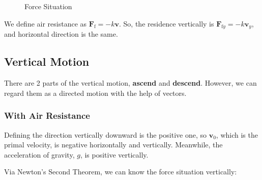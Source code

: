 \documentclass{article}
\begin{document}
\begin{figure}[H]
    \centering
    \caption{Force Situation}
    \label{fig:force-situation}
\end{figure}

We define air resistance as $\boldsymbol{F}_\mathrm{f}=-k\boldsymbol{v}$. So, the residence vertically is $\boldsymbol{F}_{\mathrm{f}y}=-k\boldsymbol{v}_y$, and horizontal direction is the same.

\subsection{Vertical Motion}

There are 2 parts of the vertical motion, \textbf{ascend} and \textbf{descend}. However, we can regard them as a directed motion with the help of vectors.

\subsubsection{With Air Resistance}

Defining the direction vertically downward is the positive one, so $\boldsymbol{v}_0$, which is the primal velocity, is negative horizontally and vertically. Meanwhile, the acceleration of gravity, $g$, is positive vertically.

Via Newton's Second Theorem, we can know the force situation vertically:

\newcommand{\derive}{\mathrm{d}}
\end{document}
